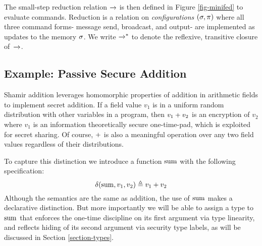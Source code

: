 The small-step reduction relation $\xrightarrow{}$ is then defined in Figure
\ref{fig-minifed} to evaluate commands. Reduction is a relation on
\emph{configurations} $(\sigma, \pi)$ where all three command forms-
message send, broadcast, and output- are implemented as updates to the
memory $\sigma$. We write $\xrightarrow{}^{*}$ to denote the reflexive, transitive
closure of\ $\xrightarrow{}$. 

\subsection{Example: Passive Secure Addition}

Shamir addition leverages homomorphic properties of addition in
arithmetic fields to implement secret addition. If a field value $v_1$
is in a uniform random distribution with other variables in a program,
then $v_1 + v_2$ is an encryption of $v_2$ where $v_1$ is an
information theoretically secure one-time-pad, which is exploited for
secret sharing. Of course, $+$ is also a meaningful operation
over any two field values regardless of their distributions.

To capture this distinction we introduce a function $\mathrm{sum}$
with the following specification:
$$
\delta(\mathrm{sum},v_1,v_2) \triangleq v_1 + v_2
$$
Although the semantics are the same as addition, the use of $\mathrm{sum}$
makes a declarative distinction. But more importantly we will be
able to assign a type to $\mathrm{sum}$ that enforces the one-time discipline
on its first argument via type linearity, and reflects hiding of
its second argument via security type labels, as will be discussed in Section
\ref{section-types}.


